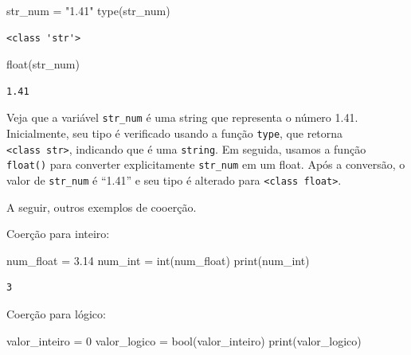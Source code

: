 \documentclass[
  portuguese,
  letterpaper,
  DIV=11,
  numbers=noendperiod]{scrreprt}
\newenvironment{Shaded}{\begin{snugshade}}{\end{snugshade}}
\newcommand{\BuiltInTok}[1]{\textcolor[rgb]{0.00,0.23,0.31}{#1}}
\newcommand{\DecValTok}[1]{\textcolor[rgb]{0.68,0.00,0.00}{#1}}
\newcommand{\FloatTok}[1]{\textcolor[rgb]{0.68,0.00,0.00}{#1}}
\newcommand{\NormalTok}[1]{\textcolor[rgb]{0.00,0.23,0.31}{#1}}
\newcommand{\OperatorTok}[1]{\textcolor[rgb]{0.37,0.37,0.37}{#1}}
\newcommand{\StringTok}[1]{\textcolor[rgb]{0.13,0.47,0.30}{#1}}
\theoremstyle{definition}
\theoremstyle{remark}
\begin{document}
\begin{Shaded}
\begin{Highlighting}[]
\NormalTok{str\_num }\OperatorTok{=} \StringTok{"1.41"}
\BuiltInTok{type}\NormalTok{(str\_num)}
\end{Highlighting}
\end{Shaded}

\begin{verbatim}
<class 'str'>
\end{verbatim}

\begin{Shaded}
\begin{Highlighting}[]
\BuiltInTok{float}\NormalTok{(str\_num)}
\end{Highlighting}
\end{Shaded}

\begin{verbatim}
1.41
\end{verbatim}

Veja que a variável \texttt{str\_num} é uma string que representa o
número 1.41. Inicialmente, seu tipo é verificado usando a função
\texttt{type}, que retorna
\texttt{\textless{}class\ \textquotesingle{}str\textquotesingle{}\textgreater{}},
indicando que é uma \texttt{string}. Em seguida, usamos a função
\texttt{float()} para converter explicitamente \texttt{str\_num} em um
float. Após a conversão, o valor de \texttt{str\_num} é ``1.41'' e seu
tipo é alterado para
\texttt{\textless{}class\ \textquotesingle{}float\textquotesingle{}\textgreater{}}.

A seguir, outros exemplos de cooerção.

Coerção para inteiro:

\begin{Shaded}
\begin{Highlighting}[]
\NormalTok{num\_float }\OperatorTok{=} \FloatTok{3.14}
\NormalTok{num\_int }\OperatorTok{=} \BuiltInTok{int}\NormalTok{(num\_float)}
\BuiltInTok{print}\NormalTok{(num\_int)}
\end{Highlighting}
\end{Shaded}

\begin{verbatim}
3
\end{verbatim}

Coerção para lógico:

\begin{Shaded}
\begin{Highlighting}[]
\NormalTok{valor\_inteiro }\OperatorTok{=} \DecValTok{0}
\NormalTok{valor\_logico }\OperatorTok{=} \BuiltInTok{bool}\NormalTok{(valor\_inteiro)}
\BuiltInTok{print}\NormalTok{(valor\_logico)}
\end{Highlighting}
\end{Shaded}
\end{document}
